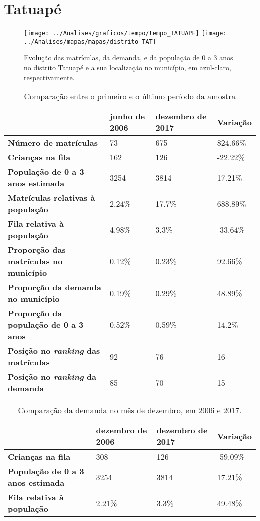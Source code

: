 \section{Tatuapé}
\begin{figure}[H]
\centering
\texttt{[image: ../Analises/graficos/tempo/tempo\_TATUAPE]}
\texttt{[image: ../Analises/mapas/mapas/distrito\_TAT]}
\caption{Evolução das matrículas, da demanda, e da população de 0 a 3 anos no distrito Tatuapé e a sua localização no município, em azul-claro, respectivamente.}
\end{figure}
\begin{table}[H]
\begin{tabular}{l|l|l|l}
\textbf{}                                      & \textbf{junho de 2006}       & \textbf{dezembro de 2017}    & \textbf{Variação} \\ \hline
\textbf{Número de matrículas}                  & 73 & 675 & 824.66\% \\ \hline
\textbf{Crianças na fila}                      & 162 & 126 & -22.22\% \\ \hline
\textbf{População de 0 a 3 anos estimada}      & 3254 & 3814 & 17.21\% \\ \hline
\textbf{Matrículas relativas à população}      & 2.24\% & 17.7\% & 688.89\% \\ \hline
\textbf{Fila relativa à população}             & 4.98\% & 3.3\% & -33.64\% \\ \hline
\textbf{Proporção das matrículas no município} & 0.12\% & 0.23\% & 92.66\% \\ \hline
\textbf{Proporção da demanda no município}     & 0.19\% & 0.29\% & 48.89\% \\ \hline
\textbf{Proporção da população de 0 a 3 anos}  & 0.52\% & 0.59\% & 14.2\% \\ \hline
\textbf{Posição no \textit{ranking} das matrículas}     & 92 & 76 & 16 \\ \hline
\textbf{Posição no \textit{ranking} da demanda}         & 85 & 70 & 15 \\ 
\end{tabular}
\caption{Comparação entre o primeiro e o último período da amostra}
\end{table}
\begin{table}[H]
\begin{tabular}{l|l|l|l}
\textbf{}                                 & \textbf{dezembro de 2006} & \textbf{dezembro de 2017} & \textbf{Variação} \\ \hline
\textbf{Crianças na fila}                      & 308 & 126 & -59.09\% \\ \hline
\textbf{População de 0 a 3 anos estimada}      & 3254 & 3814 & 17.21\% \\ \hline
\textbf{Fila relativa à população}             & 2.21\% & 3.3\% & 49.48\% \\
\end{tabular}
\caption{Comparação da demanda no mês de dezembro, em 2006 e 2017.}
\end{table}
